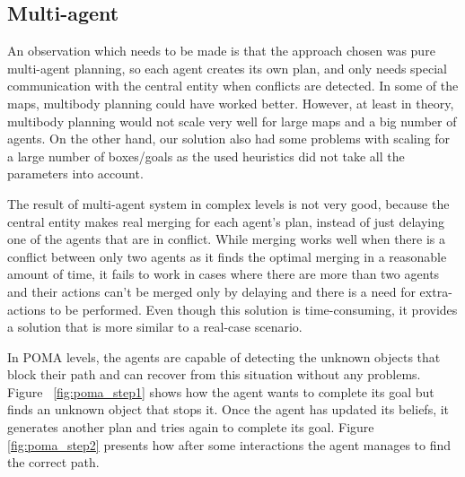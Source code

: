 \subsection{Multi-agent} %
An observation which needs to be made is that the approach chosen was pure multi-agent planning, so each agent
creates its own plan, and only needs special communication with the central entity when conflicts are
detected. In some of the maps, multibody planning could have worked better. However, at least in theory,
multibody planning would not scale very well for large maps and a big number of agents. On the other hand, our
solution also had some problems with scaling for a large number of boxes/goals as the used heuristics did not
take all the parameters into account.

The result of multi-agent system in complex levels is not very good, because the central entity makes real
merging for each agent's plan, instead of just delaying one of the agents that are in conflict. While merging
works well when there is a conflict between only two agents as it finds the optimal merging in a reasonable
amount of time, it fails to work in cases where there are more than two agents and their actions can’t be
merged only by delaying and there is a need for extra-actions to be performed. Even though this solution is
time-consuming, it provides a solution that is more similar to a real-case scenario.

In POMA levels, the agents are capable of detecting the unknown objects that block their path and can recover
from this situation without any problems. Figure ~\ref{fig:poma_step1} shows how the agent wants to complete
its goal but finds an unknown object that stops it. Once the agent has updated its beliefs, it generates
another plan and tries again to complete its goal. Figure \ref{fig:poma_step2} presents how after some
interactions the agent manages to find the correct path.

